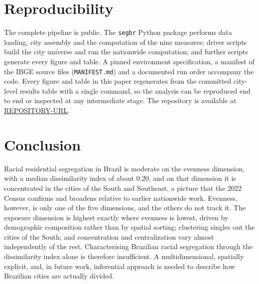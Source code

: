 \documentclass[12pt,a4paper]{article}
\begin{document}
\section{Reproducibility}\label{sec:repro}

The complete pipeline is public. The \texttt{segbr} Python package performs data loading, city assembly and the computation of the nine measures; driver scripts build the city universe and run the nationwide computation; and further scripts generate every figure and table. A pinned environment specification, a manifest of the IBGE source files (\texttt{MANIFEST.md}) and a documented run order accompany the code. Every figure and table in this paper regenerates from the committed city-level results table with a single command, so the analysis can be reproduced end to end or inspected at any intermediate stage. The repository is available at \url{REPOSITORY-URL}.

\section{Conclusion}\label{sec:conclusion}

Racial residential segregation in Brazil is moderate on the evenness dimension, with a median dissimilarity index of about 0.20, and on that dimension it is concentrated in the cities of the South and Southeast, a picture that the 2022 Census confirms and broadens relative to earlier nationwide work. Evenness, however, is only one of the five dimensions, and the others do not track it. The exposure dimension is highest exactly where evenness is lowest, driven by demographic composition rather than by spatial sorting; clustering singles out the cities of the South; and concentration and centralization vary almost independently of the rest. Characterising Brazilian racial segregation through the dissimilarity index alone is therefore insufficient. A multidimensional, spatially explicit, and, in future work, inferential approach is needed to describe how Brazilian cities are actually divided.



\end{document}
